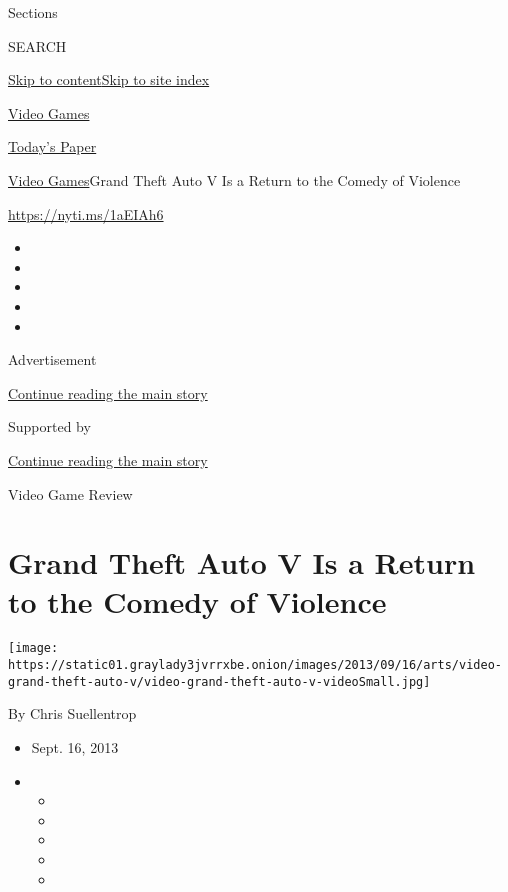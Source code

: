 Sections

SEARCH

\protect\hyperlink{site-content}{Skip to
content}\protect\hyperlink{site-index}{Skip to site index}

\href{https://www.nytimes3xbfgragh.onion/section/arts}{Video Games}

\href{https://myaccount.nytimes3xbfgragh.onion/auth/login?response_type=cookie\&client_id=vi}{}

\href{https://www.nytimes3xbfgragh.onion/section/todayspaper}{Today's
Paper}

\href{/section/arts}{Video Games}\textbar{}Grand Theft Auto V Is a
Return to the Comedy of Violence

\url{https://nyti.ms/1aEIAh6}

\begin{itemize}
\item
\item
\item
\item
\item
\end{itemize}

Advertisement

\protect\hyperlink{after-top}{Continue reading the main story}

Supported by

\protect\hyperlink{after-sponsor}{Continue reading the main story}

Video Game Review

\hypertarget{grand-theft-auto-v-is-a-return-to-the-comedy-of-violence}{%
\section{Grand Theft Auto V Is a Return to the Comedy of
Violence}\label{grand-theft-auto-v-is-a-return-to-the-comedy-of-violence}}

\texttt{[image: https://static01.graylady3jvrrxbe.onion/images/2013/09/16/arts/video-grand-theft-auto-v/video-grand-theft-auto-v-videoSmall.jpg]}

By Chris Suellentrop

\begin{itemize}
\item
  Sept. 16, 2013
\item
  \begin{itemize}
  \item
  \item
  \item
  \item
  \item
  \end{itemize}
\end{itemize}

